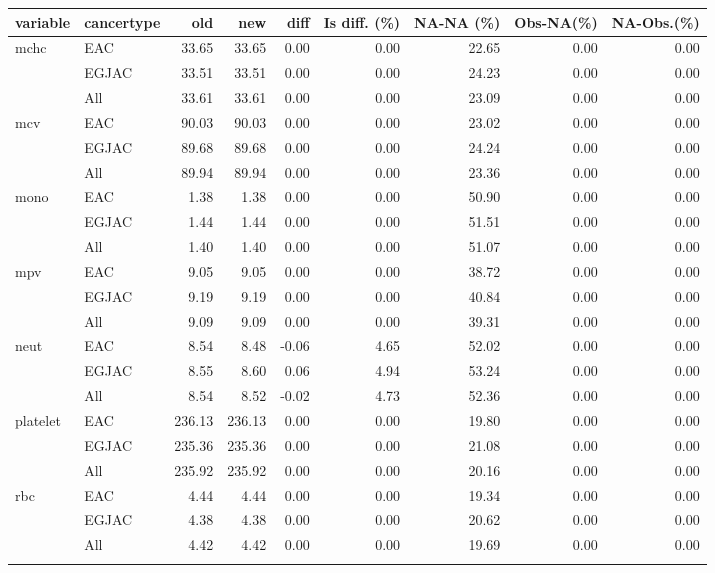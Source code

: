 \documentclass[12pt]{article}
\begin{document}
\begin{table}[ht]
\centering
\begin{tabular}{llrrrrrrr}
  \toprule
variable & cancertype & old & new & diff & Is diff. (\%) & NA-NA (\%) & Obs-NA(\%)& NA-Obs.(\%) \\ 
  \midrule
  mchc & EAC & 33.65 & 33.65 & 0.00 & 0.00 & 22.65 & 0.00 & 0.00 \\ 
   & EGJAC & 33.51 & 33.51 & 0.00 & 0.00 & 24.23 & 0.00 & 0.00 \\ 
   & All & 33.61 & 33.61 & 0.00 & 0.00 & 23.09 & 0.00 & 0.00 \\  \addlinespace
  mcv & EAC & 90.03 & 90.03 & 0.00 & 0.00 & 23.02 & 0.00 & 0.00 \\ 
   & EGJAC & 89.68 & 89.68 & 0.00 & 0.00 & 24.24 & 0.00 & 0.00 \\ 
   & All & 89.94 & 89.94 & 0.00 & 0.00 & 23.36 & 0.00 & 0.00 \\  \addlinespace
  mono & EAC & 1.38 & 1.38 & 0.00 & 0.00 & 50.90 & 0.00 & 0.00 \\ 
   & EGJAC & 1.44 & 1.44 & 0.00 & 0.00 & 51.51 & 0.00 & 0.00 \\ 
   & All & 1.40 & 1.40 & 0.00 & 0.00 & 51.07 & 0.00 & 0.00 \\  \addlinespace
  mpv & EAC & 9.05 & 9.05 & 0.00 & 0.00 & 38.72 & 0.00 & 0.00 \\ 
   & EGJAC & 9.19 & 9.19 & 0.00 & 0.00 & 40.84 & 0.00 & 0.00 \\ 
   & All & 9.09 & 9.09 & 0.00 & 0.00 & 39.31 & 0.00 & 0.00 \\  \addlinespace
  neut & EAC & 8.54 & 8.48 & -0.06 & 4.65 & 52.02 & 0.00 & 0.00 \\ 
   & EGJAC & 8.55 & 8.60 & 0.06 & 4.94 & 53.24 & 0.00 & 0.00 \\ 
   & All & 8.54 & 8.52 & -0.02 & 4.73 & 52.36 & 0.00 & 0.00 \\  \addlinespace
  platelet & EAC & 236.13 & 236.13 & 0.00 & 0.00 & 19.80 & 0.00 & 0.00 \\ 
   & EGJAC & 235.36 & 235.36 & 0.00 & 0.00 & 21.08 & 0.00 & 0.00 \\ 
   & All & 235.92 & 235.92 & 0.00 & 0.00 & 20.16 & 0.00 & 0.00 \\  \addlinespace
  rbc & EAC & 4.44 & 4.44 & 0.00 & 0.00 & 19.34 & 0.00 & 0.00 \\ 
   & EGJAC & 4.38 & 4.38 & 0.00 & 0.00 & 20.62 & 0.00 & 0.00 \\ 
   & All & 4.42 & 4.42 & 0.00 & 0.00 & 19.69 & 0.00 & 0.00 \\  \addlinespace

\end{tabular}
\end{table}
\end{document}
